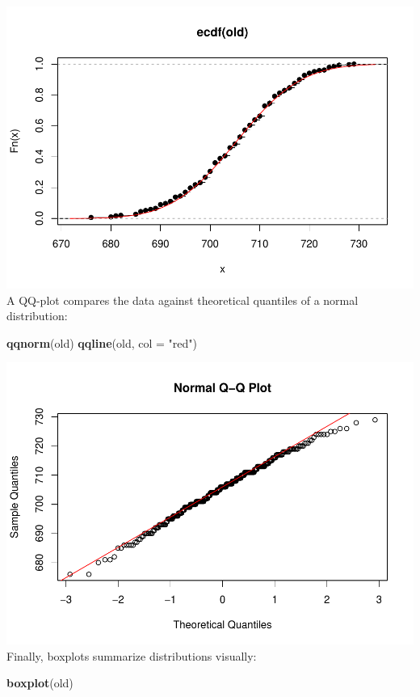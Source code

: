 \documentclass[
]{article}
\newenvironment{Shaded}{\begin{snugshade}}{\end{snugshade}}
\newcommand{\AttributeTok}[1]{\textcolor[rgb]{0.13,0.29,0.53}{#1}}
\newcommand{\FunctionTok}[1]{\textcolor[rgb]{0.13,0.29,0.53}{\textbf{#1}}}
\newcommand{\NormalTok}[1]{#1}
\newcommand{\StringTok}[1]{\textcolor[rgb]{0.31,0.60,0.02}{#1}}
\begin{document}
\includegraphics{EDA_files/figure-latex/unnamed-chunk-20-1.pdf} A
QQ-plot compares the data against theoretical quantiles of a normal
distribution:

\begin{Shaded}
\begin{Highlighting}[]
\FunctionTok{qqnorm}\NormalTok{(old)}
\FunctionTok{qqline}\NormalTok{(old, }\AttributeTok{col =} \StringTok{"red"}\NormalTok{)}
\end{Highlighting}
\end{Shaded}

\includegraphics{EDA_files/figure-latex/unnamed-chunk-21-1.pdf} Finally,
boxplots summarize distributions visually:

\begin{Shaded}
\begin{Highlighting}[]
\FunctionTok{boxplot}\NormalTok{(old)}
\end{Highlighting}
\end{Shaded}
\end{document}
